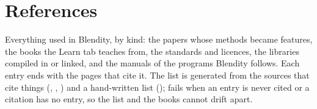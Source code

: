 \chapter{References}
\label{ch:references}
Everything used in Blendity, by kind: the papers whose methods became features, the books the Learn tab teaches from,
the standards and licences, the libraries compiled in or linked, and the manuals of the programs Blendity follows.
Each entry ends with the pages that cite it. The list is generated from the sources that cite things
(, , ) and a hand-written list
();  fails when an entry is never cited or a citation
has no entry, so the list and the books cannot drift apart.

\printbibliography[keyword=papers, heading=subbibliography, title={Papers, theses and talks}]
\printbibliography[keyword=books, heading=subbibliography, title={Books}]
\printbibliography[keyword=standards, heading=subbibliography, title={Standards, specifications and licences}]
\printbibliography[keyword=software, heading=subbibliography, title={Software and libraries}]
\printbibliography[keyword=websites, heading=subbibliography, title={Manuals and websites}]
